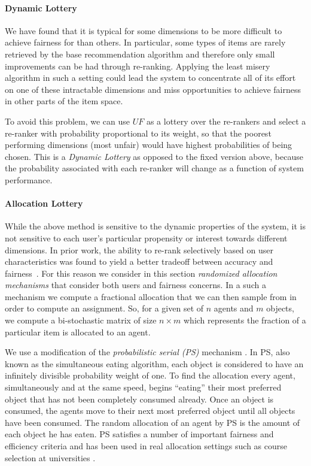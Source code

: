 

\noindent \paragraph{Dynamic Lottery} \newline
\indent We have found that it is typical for some dimensions to be more difficult to achieve fairness for than others. In particular, some types of items are rarely retrieved by the base recommendation algorithm and therefore only small improvements can be had through re-ranking. Applying the least misery algorithm in such a setting could lead the system to concentrate all of its effort on one of these intractable dimensions and miss opportunities to achieve fairness in other parts of the item space. 

To avoid this problem, we can use $UF$ as a lottery over the re-rankers and select a re-ranker with probability proportional to its weight, so that the poorest performing dimensions (most unfair) would have highest probabilities of being chosen. This is a \textit{Dynamic Lottery} as opposed to the fixed version above, because the probability associated with each re-ranker will change as a function of system performance. 

\noindent \paragraph{Allocation Lottery} \newline
\indent While the above method is sensitive to the dynamic properties of the system, it is not sensitive to each user's particular propensity or interest towards different dimensions. In prior work, the ability to re-rank selectively based on user characteristics was found to yield a better tradeoff between accuracy and fairness~\cite{liu2019personalized,sonboli-umap-2020}. For this reason we consider in this section \emph{randomized allocation mechanisms} that consider both users and fairness concerns.  In a such a mechanism we compute a fractional allocation that we can then sample from in order to compute an assignment.  So, for a given set of $n$ agents and $m$ objects, we compute a bi-stochastic matrix of size $n \times m$ which represents the fraction of a particular item is allocated to an agent.

We use a modification of the \emph{probabilistic serial (PS)} mechanism \cite{bogomolnaia2001new}.  In PS, also known as the simultaneous eating algorithm, each object is considered to have an infinitely divisible probability weight of one.  To find the allocation every agent, simultaneously and at the same speed, begins ``eating'' their most preferred object that has not been completely consumed already.  Once an object is consumed, the agents move to their next most preferred object until all objects have been consumed. The random allocation of an agent by PS is the amount of each object he has eaten. PS satisfies a number of important fairness and efficiency criteria \cite{Aziz:EqulibriaPS,Aziz:EgalRandom} and has been used in real allocation settings such as course selection at universities \cite{budish2013designing}.

